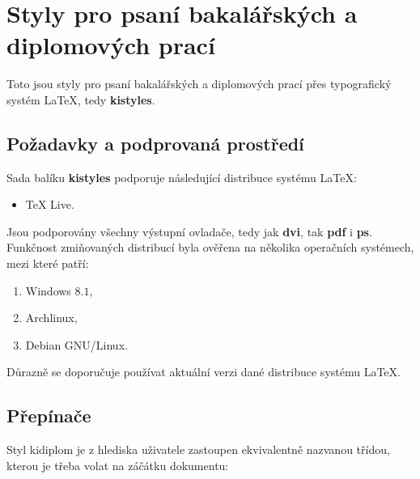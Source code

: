 \documentclass[
  program=itp,
  biblatex,
  figures=false,
  glossaries,
  index
]{kidiplom}
\begin{document}
\section{Styly pro psaní bakalářských a diplomových prací}
Toto jsou styly pro psaní bakalářských a diplomových prací přes typografický systém \LaTeX{}, tedy \textbf{kistyles}.

\subsection{Požadavky a podprovaná prostředí}
Sada balíku \textbf{kistyles} podporuje následující distribuce systému \LaTeX{}:
\begin{itemize}
\item \TeX{} Live.
\end{itemize}

Jsou podporovány všechny výstupní ovladače, tedy jak \textbf{dvi}, tak \textbf{pdf} i \textbf{ps}. Funkčnost zmiňovaných distribucí byla ověřena na několika operačních systémech, mezi které patří:
\begin{enumerate}
\item Windows $8.1$,
\item Archlinux,
\item Debian GNU/Linux.
\end{enumerate}

Důrazně se doporučuje používat aktuální verzi dané distribuce systému \LaTeX{}.


\subsection{Přepínače}
Styl kidiplom je z hlediska uživatele zastoupen ekvivalentně nazvanou třídou, kterou je třeba volat na záčátku dokumentu:
\end{document}
